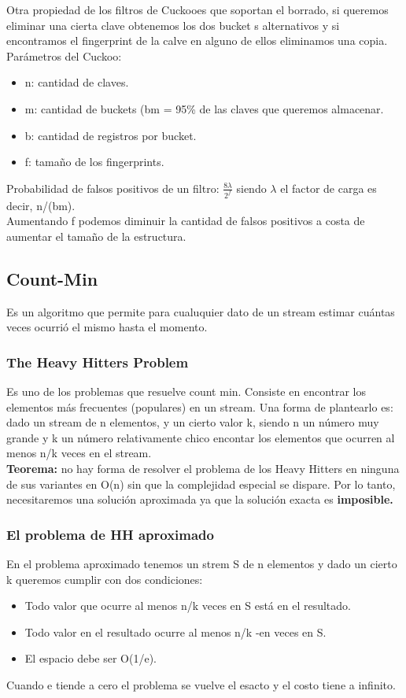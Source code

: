 \documentclass[titlepage,a4paper]{article}
\begin{document}
Otra propiedad de los filtros de Cuckooes que soportan el borrado, si queremos eliminar una cierta clave obtenemos los dos bucket s alternativos y si encontramos el fingerprint de la calve en alguno de ellos eliminamos una copia. \\

Parámetros del Cuckoo: 
\begin{itemize}
\item n: cantidad de claves. 
\item m: cantidad de buckets (bm = 95\% de las claves que queremos almacenar. 
\item b: cantidad de registros por bucket. 
\item f: tamaño de los fingerprints. 
\end{itemize}
Probabilidad de falsos positivos de un filtro: $\frac{8\lambda}{2^f}$ siendo $\lambda$ el factor de carga es decir, n/(bm). \\

Aumentando f podemos diminuir la cantidad de falsos positivos a costa de aumentar el tamaño de la estructura. 

\subsection*{Count-Min}
Es un algoritmo que permite para cualuquier dato de un stream estimar cuántas veces ocurrió el mismo hasta el momento.

\subsubsection*{The Heavy Hitters Problem}
Es uno de los problemas que resuelve count min. Consiste en encontrar los elementos más frecuentes (populares) en un stream. Una forma de plantearlo es: dado un stream de n elementos, y un cierto valor k, siendo n un número muy grande y k un número relativamente chico encontar los elementos que ocurren al menos n/k veces en el stream. \\

\textbf{Teorema:} no hay forma de resolver el problema de los Heavy Hitters en ninguna de sus variantes en O(n) sin que la complejidad especial se dispare. Por lo tanto, necesitaremos una solución aproximada ya que la solución exacta es \textbf{imposible. }\\

\subsubsection*{El problema de HH aproximado}
En el problema aproximado tenemos un strem S de n elementos y dado un cierto k queremos cumplir con dos condiciones: 
\begin{itemize}
\item Todo valor que ocurre al menos n/k veces en S está en el resultado. 
\item Todo valor en el resultado ocurre al menos n/k -en veces en S. 
\item El espacio debe ser O(1/e). 
\end{itemize}
Cuando e tiende a cero el problema se vuelve el esacto y el costo tiene a infinito. 
\end{document}
